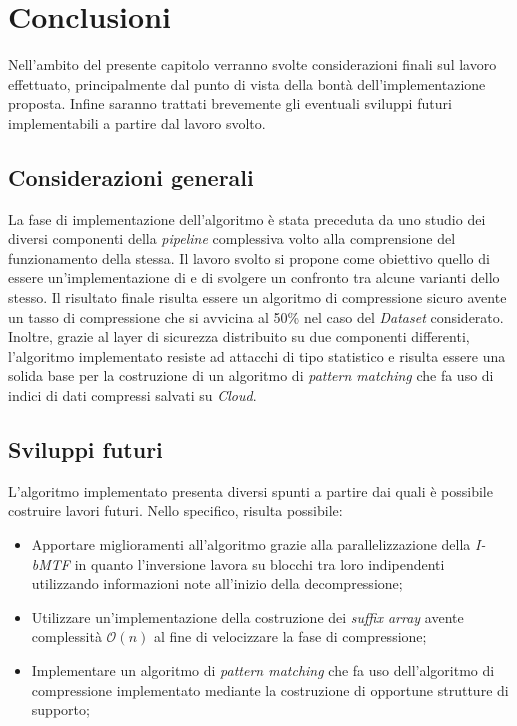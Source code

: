 \chapter{Conclusioni} %
%


\begin{citazione}
Nell'ambito del presente capitolo verranno svolte considerazioni finali sul lavoro effettuato, principalmente dal punto di vista della bontà dell'implementazione proposta. Infine saranno trattati brevemente gli eventuali sviluppi futuri implementabili a partire dal lavoro svolto.
\end{citazione}
\newpage

\section{Considerazioni generali}
La fase di implementazione dell'algoritmo è stata preceduta da uno studio dei diversi componenti della \emph{pipeline} complessiva volto alla comprensione del funzionamento della stessa. Il lavoro svolto si propone come obiettivo quello di essere un'implementazione di \cite{zeng2018secure} e di svolgere un confronto tra alcune varianti dello stesso. Il risultato finale risulta essere un algoritmo di compressione sicuro avente un tasso di compressione che si avvicina al 50\% nel caso del \emph{Dataset} considerato. Inoltre, grazie al layer di sicurezza distribuito su due componenti differenti, l'algoritmo implementato resiste ad attacchi di tipo statistico e risulta essere una solida base per la costruzione di un algoritmo di \emph{pattern matching} che fa uso di indici di dati compressi salvati su \emph{Cloud}.
\section{Sviluppi futuri} %
L'algoritmo implementato presenta diversi spunti a partire dai quali è possibile costruire lavori futuri. Nello specifico, risulta possibile:
\begin{itemize}
    \item Apportare miglioramenti all'algoritmo grazie alla parallelizzazione della \emph{I-bMTF} in quanto l'inversione lavora su blocchi tra loro indipendenti utilizzando informazioni note all'inizio della decompressione;
    \item Utilizzare un'implementazione della costruzione dei \emph{suffix array} avente complessità $\mathcal{O}(n)$ al fine di velocizzare la fase di compressione;
    \item Implementare un algoritmo di \emph{pattern matching} che fa uso dell'algoritmo di compressione implementato mediante la costruzione di opportune strutture di supporto;
\end{itemize} 